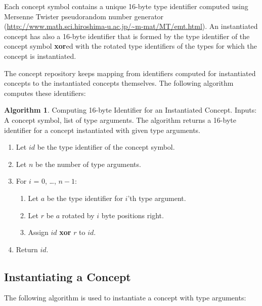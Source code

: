 \documentclass[a4paper,oneside,11pt]{book}
\theoremstyle{definition}
\newtheorem{algo}{Algorithm}[section]
\begin{document}
Each concept symbol contains a unique 16-byte type identifier computed using Mersenne Twister pseudorandom number generator
(\url{http://www.math.sci.hiroshima-u.ac.jp/~m-mat/MT/emt.html}).
An instantiated concept has also a 16-byte identifier that is formed by the type identifier of the concept symbol \textbf{xor}ed with the
rotated type identifiers of the types for which the concept is instantiated.

The concept repository keeps mapping from identifiers computed for instantiated concepts to the instantiated concepts themselves.
The following algorithm computes these identifiers:

\begin{algo}\label{computeconceptid} Computing 16-byte Identifier for an Instantiated Concept. Inputs: A concept symbol, list of type arguments.
The algorithm returns a 16-byte identifier for a concept instantiated with given type arguments.
\begin{enumerate}
\item
Let $id$ be the type identifier of the concept symbol.
\item
Let $n$ be the number of type arguments.
\item
For $i$ = 0, \ldots, $n - 1$:
\begin{enumerate}
\item
Let $a$ be the type identifier for $i$'th type argument.
\item
Let $r$ be $a$ rotated by $i$ byte positions right.
\item
Assign $id$ \textbf{xor} $r$ to $id$.
\end{enumerate}
\item
Return $id$.
\end{enumerate}
\end{algo}

\clearpage
\subsection{Instantiating a Concept}

The following algorithm is used to instantiate a concept with type arguments:
\end{document}
